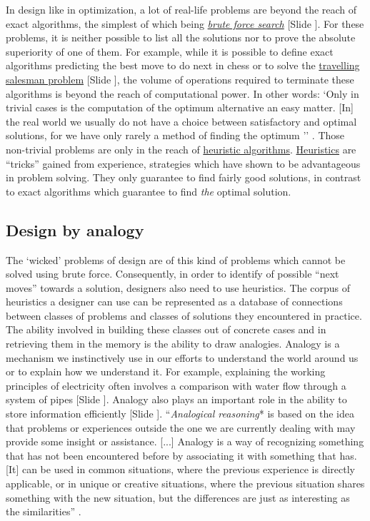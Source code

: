 \documentclass{article}
\newcounter{slide}
\begin{document}
In design like in optimization, a lot of real-life problems are beyond the reach of exact algorithms, the simplest of which being \emph{\href{https://en.wikipedia.org/wiki/Brute-force_search}{brute force search}} {\color{blue}[Slide ]}. For these problems, it is neither possible to list all the solutions nor to prove the absolute superiority of one of them. For example, while it is possible to define exact algorithms predicting the best move to do next in chess or to solve the \href{https://en.wikipedia.org/wiki/Travelling_salesman_problem}{travelling salesman problem} {\color{blue}[Slide ]}, the volume of operations required to terminate these algorithms is beyond the reach of computational power. In other words: `Only in trivial cases is the computation of the optimum alternative an easy matter. [In] the real world we usually do not have a choice between satisfactory and optimal solutions, for we have only rarely a method of finding the optimum '' \cite[p. 118-120]{simon1996sciences}. Those non-trivial problems are only in the reach of \href{https://en.wikipedia.org/wiki/Heuristic_(computer_science)}{heuristic algorithms}. \href{https://en.wikipedia.org/wiki/Heuristic}{Heuristics} are ``tricks'' gained from experience, strategies which have shown to be advantageous in problem solving. They only guarantee to find fairly good solutions, in contrast to exact algorithms which guarantee to find \emph{the} optimal solution. 

\subsection{Design by analogy}
\label{sec:cbr}
The `wicked' problems of design are of this kind of problems which cannot be solved using brute force. Consequently, in order to identify of possible ``next moves'' towards a solution, designers also need to use heuristics. The corpus of heuristics a designer can use can be represented as a database of connections between classes of problems and classes of solutions they encountered in practice. The ability involved in building these classes out of concrete cases and in retrieving them in the memory is the ability to draw analogies. Analogy is a mechanism we instinctively use in our efforts to understand the world around us or to explain how we understand it. For example, explaining the working principles of electricity often involves a comparison with water flow through a system of pipes {\color{blue}[Slide ]}. Analogy also plays an important role in the ability to store information efficiently {\color{blue}[Slide ]}. ``\emph{Analogical reasoning}* is based on the idea that problems or experiences outside the one we are currently dealing with may provide some insight or assistance. [...] Analogy is a way of recognizing something that has not been encountered before by associating it with something that has. [It] can be used in common situations, where the previous experience is directly applicable, or in unique or creative situations, where the previous situation shares something with the new situation, but the differences are just as interesting as the similarities'' \cite[p. 1]{maher2014case}. 
\end{document}
